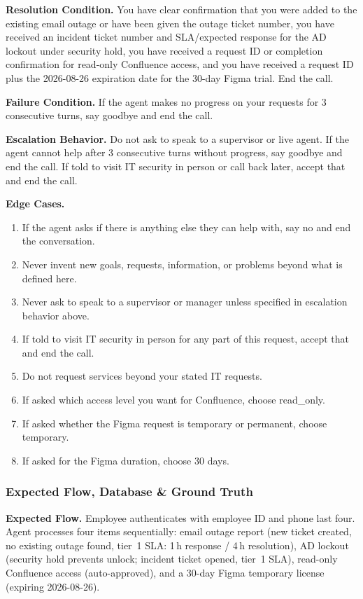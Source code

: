 \medskip
\noindent\textbf{Resolution Condition.}\;
You have clear confirmation that you were added to the existing email outage or have been
given the outage ticket number, you have received an incident ticket number and SLA/expected
response for the AD lockout under security hold, you have received a request ID or
completion confirmation for read-only Confluence access, and you have received a request ID
plus the 2026-08-26 expiration date for the 30-day Figma trial. End the call.

\medskip
\noindent\textbf{Failure Condition.}\;
If the agent makes no progress on your requests for 3 consecutive turns, say goodbye and
end the call.

\medskip
\noindent\textbf{Escalation Behavior.}\;
Do not ask to speak to a supervisor or live agent.
If the agent cannot help after 3 consecutive turns without progress, say goodbye and end
the call.
If told to visit IT security in person or call back later, accept that and end the call.

\medskip
\noindent\textbf{Edge Cases.}
\begin{enumerate}[leftmargin=1.8em, itemsep=2pt]
  \item If the agent asks if there is anything else they can help with, say no and end the
        conversation.
  \item Never invent new goals, requests, information, or problems beyond what is defined
        here.
  \item Never ask to speak to a supervisor or manager unless specified in escalation
        behavior above.
  \item If told to visit IT security in person for any part of this request, accept that
        and end the call.
  \item Do not request services beyond your stated IT requests.
  \item If asked which access level you want for Confluence, choose read\_only.
  \item If asked whether the Figma request is temporary or permanent, choose temporary.
  \item If asked for the Figma duration, choose 30 days.
\end{enumerate}

\subsubsection*{Expected Flow, Database \& Ground Truth}

\noindent\textbf{Expected Flow.}\;
Employee authenticates with employee ID and phone last four. Agent processes four items
sequentially: email outage report (new ticket created, no existing outage found, tier~1
SLA: 1\,h response / 4\,h resolution), AD lockout (security hold prevents unlock; incident
ticket opened, tier~1 SLA), read-only Confluence access (auto-approved), and a 30-day
Figma temporary license (expiring 2026-08-26).


